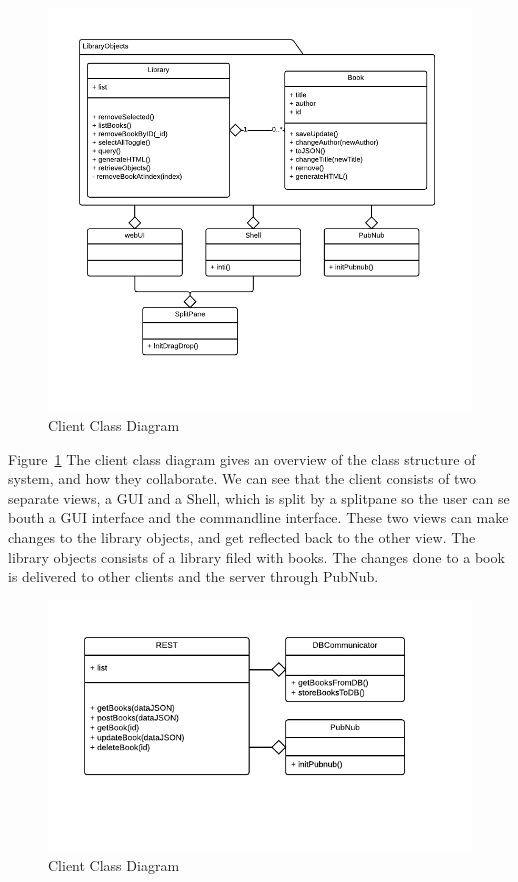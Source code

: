 \begin{figure}
\centering
\includegraphics[width=6in]{image/ClassDiagram.png}
\caption{Client Class Diagram}
\label{figure:clientClassDiagram}
\end{figure}

Figure~\ref{figure:clientClassDiagram} The client class diagram gives an overview of the class structure of system, and how they collaborate. We can see that the client consists of two separate views, a GUI and a Shell, which is split by a splitpane so the user can se bouth a GUI interface and the commandline interface. These two views can make changes to the library objects, and get reflected back to the other view. The library objects consists of a library filed with books. The changes done to a book is delivered to other clients and the server through PubNub. 

\begin{figure}
\centering
\includegraphics[width=6in]{image/ServerClassDiagram.png}
\caption{Client Class Diagram}
\label{figure:serverClassDiagram}
\end{figure}

